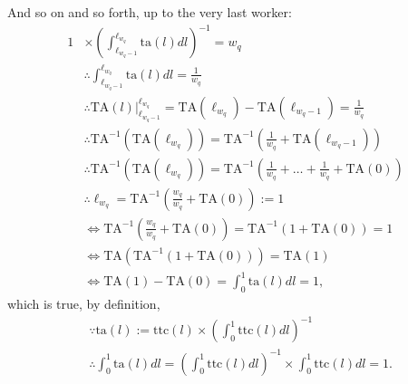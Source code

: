 \documentclass[hidelinks, nonatbib]{elsarticle}
\begin{document}
\begin{enumerate}
And so on and so forth, up to the very last worker:
\begin{align}
    1 
    &\times 
    \left(
        \int_{\ell_{w_q - 1}}^{\ell_{w_q}}
        \text{ta}(l)
        dl
    \right) ^ {-1}
    =
    w_q
    \\
    &\therefore
    \int_{\ell_{w_q - 1}}^{\ell_{w_q}}
    \text{ta}(l)
    dl
    =
    \frac{1}{w_q}
    \\
    &\therefore
    \text{TA}(l)
    \big|_{\ell_{w_q - 1}}^{\ell_{w_q}}
    =
    \text{TA}(\ell_{w_q})
    -
    \text{TA}(\ell_{w_q - 1})
    =
    \frac{1}{w_q}
    \\
    &\therefore
    \text{TA}^{-1}(
        \text{TA}(\ell_{w_q})
    )
    =
    \text{TA}^{-1}\left(
        \frac{1}{w_q}
        +
        \text{TA}(\ell_{w_q - 1})
    \right)
    \\
    &\therefore
    \text{TA}^{-1}(
        \text{TA}(\ell_{w_q})
    )
    =
    \text{TA}^{-1}\left(
        \frac{1}{w_q}
        +
        \dots
        +
        \frac{1}{w_q}
        +
        \text{TA}(0)
    \right)
    \\
    &\therefore
    \ell_{w_q}
    =
    \text{TA}^{-1}\left(
        \frac{w_q}{w_q}
        +
        \text{TA}(0)
    \right)
    := 1
    \\
    &\iff
    \text{TA}^{-1}\left(
        \frac{w_q}{w_q}
        +
        \text{TA}(0)
    \right)
    =
    \text{TA}^{-1}\left(
        1
        +
        \text{TA}(0)
    \right)
    =
    1
    \\
    &\iff
    \text{TA}\left(
        \text{TA}^{-1}\left(
        1
        +
        \text{TA}(0)
    \right)
    \right)
    =
    \text{TA}(1)
    \\
    &\iff
    \text{TA}(1)
    -
    \text{TA}(0)
    =
    \int_{0}^{1}{
        \text{ta}(l)
        dl
    }
    =
    1
    ,
\end{align}
which is true, by definition,
\begin{align}
    &\because
    \text{ta}(l) 
    :=
    \text{ttc}(l)
    \times
    \left(
        \int_{0}^{1}{
            \text{ttc}(l)
            dl
        }
    \right) ^ {-1}
    \\
    &\therefore
    \int_{0}^{1}{
        \text{ta}(l)
        dl
    }
    =
    \left(
        \int_{0}^{1}
        \text{ttc}(l)
        dl
    \right) ^ {-1}
    \times
    \int_{0}^{1}{
        \text{ttc}(l)
        dl
    }
    =
    1
    .
\end{align}


\end{enumerate}
\end{document}
